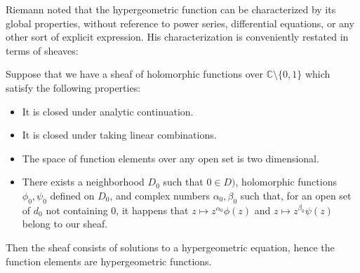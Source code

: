 \documentclass[12pt]{article}
\begin{document}
Riemann noted that the hypergeometric function can be characterized
by its global properties, without reference to power series, differential
equations, or any other sort of explicit expression.  His characterization
is conveniently restated in terms of sheaves:

Suppose that we have a sheaf of holomorphic functions over $\mathbb{C} 
\setminus \{0,1\}$ which satisfy the following properties:
\begin{itemize}
\item It is closed under analytic continuation.
\item It is closed under taking linear combinations.
\item The space of function elements over any open set is two dimensional.
\item There exists a neighborhood $D_0$ such that $0 \in D)$, holomorphic 
functions $\phi_0, \psi_0$ defined on $D_0$, and complex numbers $\alpha_0,
\beta_0$ such that, for an open set of $d_0$ not containing $0$, it happens that 
$z \mapsto z^{\alpha_0} \phi(z)$ and $z \mapsto z^{\beta_0} \psi(z)$ belong to 
our sheaf.
\end{itemize}
Then the sheaf consists of solutions to a hypergeometric equation, hence
the function elements are hypergeometric functions.
\end{document}

